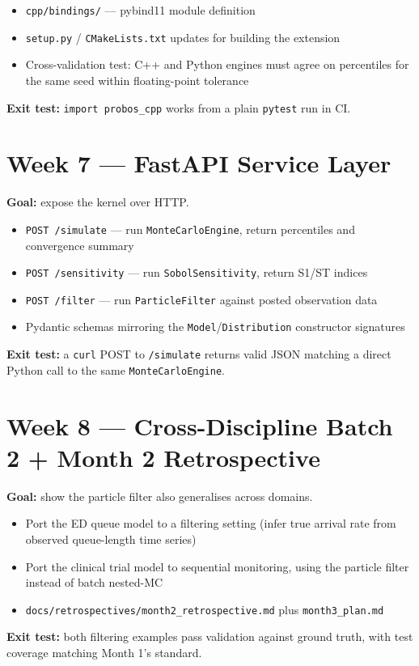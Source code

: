 \documentclass[11pt]{article}
\begin{document}
\begin{itemize}[leftmargin=*]
  \item \texttt{cpp/bindings/} --- pybind11 module definition
  \item \texttt{setup.py} / \texttt{CMakeLists.txt} updates for building
    the extension
  \item Cross-validation test: C++ and Python engines must agree on
    percentiles for the same seed within floating-point tolerance
\end{itemize}
\textbf{Exit test:} \texttt{import probos\_cpp} works from a plain
\texttt{pytest} run in CI.

\section*{Week 7 --- FastAPI Service Layer}
\textbf{Goal:} expose the kernel over HTTP.

\begin{itemize}[leftmargin=*]
  \item \texttt{POST /simulate} --- run \texttt{MonteCarloEngine}, return
    percentiles and convergence summary
  \item \texttt{POST /sensitivity} --- run \texttt{SobolSensitivity},
    return S1/ST indices
  \item \texttt{POST /filter} --- run \texttt{ParticleFilter} against
    posted observation data
  \item Pydantic schemas mirroring the \texttt{Model}/\texttt{Distribution}
    constructor signatures
\end{itemize}
\textbf{Exit test:} a \texttt{curl} POST to \texttt{/simulate} returns
valid JSON matching a direct Python call to the same
\texttt{MonteCarloEngine}.

\section*{Week 8 --- Cross-Discipline Batch 2 + Month 2 Retrospective}
\textbf{Goal:} show the particle filter also generalises across domains.

\begin{itemize}[leftmargin=*]
  \item Port the ED queue model to a filtering setting (infer true
    arrival rate from observed queue-length time series)
  \item Port the clinical trial model to sequential monitoring, using the
    particle filter instead of batch nested-MC
  \item \texttt{docs/retrospectives/month2\_retrospective.md} plus
    \texttt{month3\_plan.md}
\end{itemize}
\textbf{Exit test:} both filtering examples pass validation against
ground truth, with test coverage matching Month 1's standard.
\end{document}
